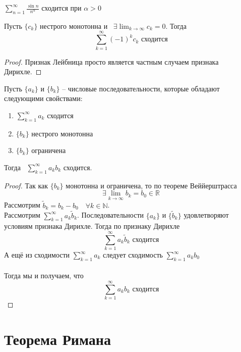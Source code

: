 \documentclass[11pt]{article}
\begin{document}
\begin{example}
  $\displaystyle \sum_{n = 1}^{\infty} \frac{\sin n}{n^{\alpha}}$ сходится 
  при $\alpha > 0$
\end{example}

\begin{theorem}
  Пусть $\{c_k\}$ нестрого монотонна и \ $\exists \displaystyle \lim_{k \to 
  \infty} c_k = 0$. Тогда 
  \[\sum_{k = 1}^{\infty} (-1)^kc_k \text{ сходится}\]
\end{theorem}

\begin{proof}
  Признак Лейбница просто является частным случаем признака Дирихле.
\end{proof}

\begin{theorem}
  Пусть $\{a_k\}$ и $\{b_k\}$ -- числовые последовательности, которые 
  обладают следующими свойствами:
  \begin{enumerate}
    \item $\displaystyle \sum_{k = 1}^{\infty} a_k$ сходится
    \item $\{b_k\}$ нестрого монотонна
    \item $\{b_k\}$ ограничена
  \end{enumerate}
  Тогда \ $\displaystyle \sum_{k = 1}^{\infty} a_kb_k$ сходится.
\end{theorem}

\begin{proof}
  Так как $\{b_k\}$ монотонна и ограничена, то по теореме Веййерштрасса 
  \[\exists \lim_{k \to \infty} b_k = b_0 \in \mathbb{R}\]
  Рассмотрим $\widetilde{b}_k = b_k - b_0 \quad \forall k \in \mathbb{N}$. \\
  Рассмотрим $\displaystyle \sum_{k = 1}^{\infty} a_k\widetilde{b}_k$. 
  Последовательности $\{a_k\}$ и $\{\widetilde{b}_k\}$ удовлетворяют условиям 
  признака Дирихле. Тогда по признаку Дирихле
  \[\sum_{k = 1}^{\infty} a_k\widetilde{b}_k \text{ сходится}\]
  А ещё из сходимости $\displaystyle \sum_{k = 1}^{\infty} a_k$ следует 
  сходимость $\displaystyle \sum_{k = 1}^{\infty} a_kb_0$ \\ \\
  Тогда мы и получаем, что \[\sum_{k = 1}^{\infty} a_kb_k \text{ сходится}\]
\end{proof}

\section{Теорема Римана}
\end{document}
